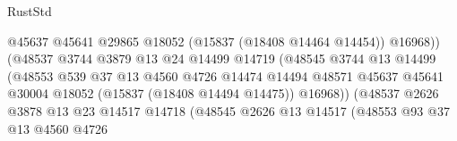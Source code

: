 \begin{lexlean}{RustStd}
\begin{coremodule}
                                              @45637
                                              @45641
                                              @29865
                                              @18052
                                              (@15837 (@18408 @14464 @14454))
                                              @16968))
                                          (@48537
                                            @3744
                                            @3879
                                            @13
                                            @24
                                            @14499
                                            @14719
                                            (@48545
                                              @3744
                                              @13
                                              @14499
                                              (@48553
                                                @539
                                                @37
                                                @13
                                                @4560
                                                @4726
                                                @14474
                                                @14494
                                                @48571
                                                @45637
                                                @45641
                                                @30004
                                                @18052
                                                (@15837 (@18408 @14494 @14475))
                                                @16968))
                                            (@48537
                                              @2626
                                              @3878
                                              @13
                                              @23
                                              @14517
                                              @14718
                                              (@48545
                                                @2626
                                                @13
                                                @14517
                                                (@48553
                                                  @93
                                                  @37
                                                  @13
                                                  @4560
                                                  @4726

\end{coremodule}
\end{lexlean}
